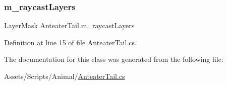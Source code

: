 \subsubsection{\texorpdfstring{m\+\_\+raycast\+Layers}{m\_raycastLayers}}
{\footnotesize\ttfamily Layer\+Mask Anteater\+Tail.\+m\+\_\+raycast\+Layers}



Definition at line 15 of file Anteater\+Tail.\+cs.



The documentation for this class was generated from the following file\+:\begin{DoxyCompactItemize}
\item 
Assets/\+Scripts/\+Animal/\mbox{\hyperlink{_anteater_tail_8cs}{Anteater\+Tail.\+cs}}\end{DoxyCompactItemize}
